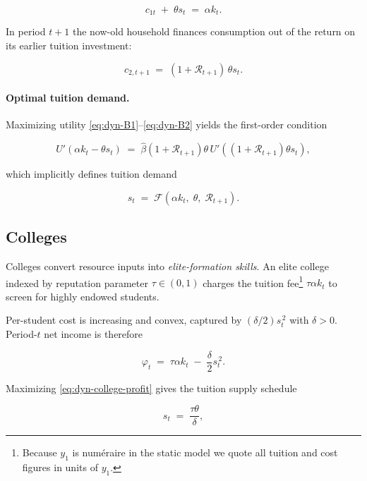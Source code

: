 \documentclass[12pt,letterpaper]{article}
\begin{document}
\begin{equation}\label{eq:dyn-B1}
	c_{1t}\;+\;\theta s_t \;=\; \alpha k_t .
\end{equation}

In period $t\!+\!1$ the now-old household finances consumption out of the
return on its earlier tuition investment:

\begin{equation}\label{eq:dyn-B2}
	c_{2,t+1} \;=\; (1+\mathcal{R}_{t+1})\,\theta s_t .
\end{equation}

\paragraph{Optimal tuition demand.}
Maximizing utility \eqref{eq:dyn-B1}–\eqref{eq:dyn-B2} yields the first-order condition

\begin{equation}\label{eq:dyn-FOC}
	U'(\alpha k_t-\theta s_t)
	\;=\;
	\hat{\beta}(1+\mathcal{R}_{t+1})\theta\,
	U'((1+\mathcal{R}_{t+1})\theta s_t),
\end{equation}

which implicitly defines tuition demand

\[
s_t \;=\; \mathcal{F}\!\left(\alpha k_t,\;\theta,\;\mathcal{R}_{t+1}\right).
\]

\subsection{Colleges}\label{subsec:dyn-colleges}

Colleges convert resource inputs into \emph{elite-formation skills}.
An elite college indexed by reputation parameter $\tau\!\in(0,1)$ charges the
tuition fee\footnote{Because $y_1$ is numéraire in the static model we quote all
	tuition and cost figures in units of $y_1$.}
$\tau\alpha k_t$ to screen for highly endowed students.

Per-student cost is increasing and convex, captured by
$(\delta/2)s_t^{\,2}$ with $\delta>0$.  Period-$t$ net income is therefore

\begin{equation}\label{eq:dyn-college-profit}
	\varphi_t \;=\;
	\tau\alpha k_t \;-\;\frac{\delta}{2}s_t^{\,2}.
\end{equation}

Maximizing \eqref{eq:dyn-college-profit} gives the tuition supply schedule

\begin{equation}\label{eq:dyn-college-supply}
	s_t \;=\; \frac{\tau\theta}{\delta},
\end{equation}
\end{document}
